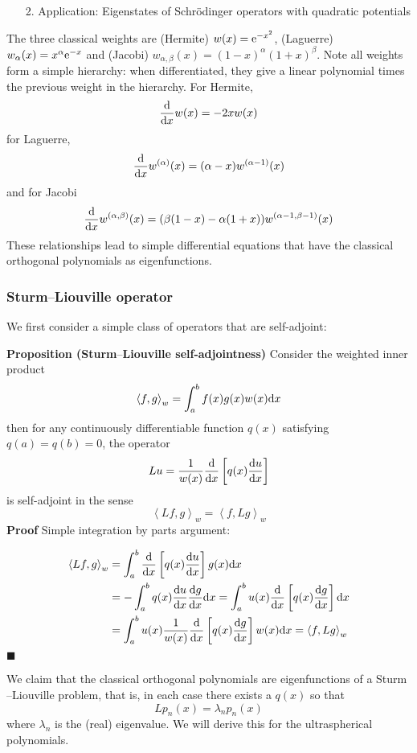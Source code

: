 \documentclass[12pt,landscape]{article}
\def\D{ {\rm d} }
\def\E{ {\rm e} }
\def\addtab#1={#1\;&=}
\def\ccr{\\\addtab}
\def\ip<#1>{\left\langle{#1}\right\rangle}
\def\dx{\D x}
\def\endash{–}
\def\addtab#1={#1\;&=}
\def\ccr{\\\addtab}
\begin{document}
{\begin{itemize}
\begin{itemize}
\item Differential equation for ultraspherical polynomials

\end{itemize}

\item[2. ] Application: Eigenstates of Schrödinger operators with quadratic potentials

\end{itemize}
The three classical weights are (Hermite) $w(x) = \E^{-x^2}$, (Laguerre) $w_\alpha(x) = x^\alpha \E^{-x}$ and (Jacobi) $w_{\alpha,\beta}(x) = (1-x)^\alpha (1+x)^\beta$. Note all weights form a simple hierarchy: when differentiated, they give a linear polynomial times the previous weight in the hierarchy.  For Hermite,
\[
{\D \over \dx} w(x) = -2x w(x)
\]
for Laguerre,
\[
{\D \over \dx} w^{(\alpha)}(x) = (\alpha  - x) w^{(\alpha-1)}(x)
\]
and for Jacobi
\[
{\D \over \dx} w^{(\alpha,\beta)}(x) = (\beta(1-x) - \alpha(1+x)) w^{(\alpha-1,\beta-1)}(x)
\]
These relationships  lead to simple differential equations that have the classical orthogonal polynomials as eigenfunctions.

\subsubsection{Sturm\ensuremath{\endash}Liouville operator}
We first consider a simple class of operators that are self-adjoint:

\textbf{Proposition (Sturm\ensuremath{\endash}Liouville self-adjointness)} Consider the weighted inner product
\[
\ip<f,g>_w = \int_a^b f(x) g(x) w(x) \dx
\]
then for any continuously differentiable function $q(x)$ satisfying $q(a) = q(b) = 0$, the operator
\[
Lu = {1 \over w(x)} {\D \over \dx}\left[ q(x) {\D u\over \dx} \right]
\]
is self-adjoint in the sense
\[
\ip<L f,g>_w = \ip<f, Lg>_w
\]
\textbf{Proof} Simple integration by parts argument:


\begin{align*}
\ip<L f,g>_w &= \int_a^b {\D \over \dx}\left[ q(x) {\D u\over \dx}\right]  g(x)\dx \ccr
=  -\int_a^b q(x) {\D u\over \dx}    {\D g\over \dx} \dx =  \int_a^b   u(x)  {\D \over \dx} \left[ q(x) {\D g\over \dx}\right] \dx \ccr
=
 \int_a^b   u(x)  {1 \over w(x)} {\D \over \dx}\left[q(x) {\D g\over \dx}\right] w(x) \dx = \ip<f, Lg>_w
 \end{align*}
\ensuremath{\blacksquare}

We claim that the classical orthogonal polynomials are eigenfunctions of a Sturm\ensuremath{\endash}Liouville problem, that is, in each case there exists a $q(x)$ so that
\[
L p_n(x) = \lambda_n p_n(x)
\]
where $\lambda_n$ is the (real) eigenvalue. We will derive this for the ultraspherical polynomials.

}
\end{document}
